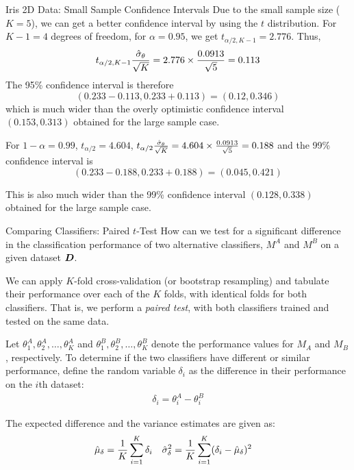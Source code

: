 \begin{frame}{Iris 2D Data: Small Sample Confidence Intervals}
Due to the small sample
size ($K=5$), we can get a better conf\/{i}dence interval by using the $t$
distribution. For $K-1=4$ degrees of freedom, for $\alpha=0.95$, we get
$t_{\alpha/2,K-1} = 2.776$.
Thus,
$$t_{\alpha/2,K-1}{\hat{\sigma}_\theta \over \sqrt{K}} = 2.776 \times {0.0913
\over \sqrt{5}}  = 0.113$$
The 95\% conf\/{i}dence interval is therefore $$(0.233-0.113,0.233+0.113) =
(0.12, 0.346)$$
which is much wider than the overly optimistic
conf\/{i}dence interval $(0.153,0.313)$
obtained for the large sample case.

For $1-\alpha=0.99$, $t_{\alpha/2} = 4.604$, 
$t_{\alpha/2}{\hat{\sigma}_\theta \over \sqrt{K}} = 4.604 \times {0.0913
\over \sqrt{5}}  = 0.188$ and the 99\%
conf\/{i}dence interval is $$(0.233-0.188,0.233+0.188) = (0.045, 0.421)$$ 

This is also much wider than the
99\% conf\/{i}dence interval $(0.128,0.338)$ obtained
for the large sample case.

\end{frame}

\ifdefined\wox \begin{frame} \titlepage \end{frame} \fi

\begin{frame}{Comparing Classif\/{i}ers: Paired $t$-Test}
How can we test for a signif\/{i}cant
difference in the classif\/{i}cation performance of two alternative
classif\/{i}ers, $M^A$ and $M^B$ on a given dataset ${\boldsymbol D}$.

\medskip
We can apply $K$-fold
cross-validation (or bootstrap resampling) and tabulate their
performance over each of the $K$ folds, with identical folds for
both classif\/{i}ers. 
That is, we perform a {\em paired test}, with
both classif\/{i}ers trained and tested on the same data. 

\medskip
Let
$\theta_1^A, \theta_2^A, \ldots, \theta_K^A$ and $\theta_1^B,
\theta_2^B, \ldots, \theta_K^B$ denote the performance values for
$M_A$ and $M_B$, respectively. To determine if the two classif\/{i}ers
have different or similar performance, def\/{i}ne the random variable $\delta_i$ as the difference in their performance on the $i$th
dataset:
\begin{align*}
  \delta_i = \theta_i^A - \theta_i^B
\end{align*}

\medskip
The expected difference and the
variance estimates are given as:
\begin{align*}
  \hat{\mu}_{\delta} &= {1\over K} \sum_{i=1}^K \delta_i &
  \hat{\sigma}^2_{\delta} &= {1\over K} \sum_{i=1}^K (\delta_i -
  \hat{\mu}_{\delta})^2
\end{align*}
\end{frame}


